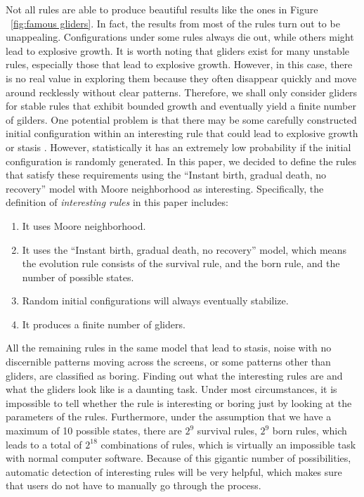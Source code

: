 \documentclass[12pt]{article}
\numberwithin{figure}{section} %
\begin{document}
Not all rules are able to produce beautiful results like the ones in Figure ~\ref{fig:famous gliders}. In fact, the results from most of the rules turn out to be unappealing. Configurations under some rules always die out, while others might lead to explosive growth. It is worth noting that gliders exist for many unstable rules, especially those that lead to explosive growth. However, in this case, there is no real value in exploring them because they often disappear quickly and move around recklessly without clear patterns. Therefore, we shall only consider gliders for stable rules that exhibit bounded growth and eventually yield a finite number of gilders. One potential problem is that there may be some carefully constructed initial configuration within an interesting rule that could lead to explosive growth or stasis \cite{Gliders in Cellular Automata}. However, statistically it has an extremely low probability if the initial configuration is randomly generated. In this paper, we decided to define the rules that satisfy these requirements using the “Instant birth, gradual death, no recovery” model with Moore neighborhood as interesting. Specifically, the definition of \textit{interesting rules} in this paper includes: 
\begin{enumerate}[topsep=0pt,itemsep=-1ex,partopsep=1ex,parsep=1ex]
\item It uses Moore neighborhood. 
\item It uses the “Instant birth, gradual death, no recovery” model, which means the evolution rule consists of the survival rule, and the born rule, and the number of possible states. 
\item Random initial configurations will always eventually stabilize. 
\item It produces a finite number of gliders. 
\end{enumerate}

All the remaining rules in the same model that lead to stasis, noise with no discernible patterns moving across the screens, or some patterns other than gliders, are classified as boring. Finding out what the interesting rules are and what the gliders look like is a daunting task. Under most circumstances, it is impossible to tell whether the rule is interesting or boring just by looking at the parameters of the rules. Furthermore, under the assumption that we have a maximum of 10 possible states, there are $2^9$ survival rules, $2^9$ born rules, which leads to a total of $2^{18}$ combinations of rules, which is virtually an impossible task with normal computer software. Because of this gigantic number of possibilities, automatic detection of interesting rules will be very helpful, which makes sure that users do not have to manually go through the process. 
\end{document}
